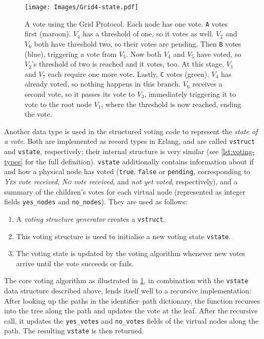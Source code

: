 \documentclass[12pt,chapterprefix=true,toc=bibliography,numbers=noendperiod,
               footnotes=multiple,twoside]{scrreprt}
\newcommand{\yes}{{\fontfamily{jkposn}\selectfont\textsc{Yes}}}
\newcommand{\no}{{\fontfamily{jkposn}\selectfont\textsc{No}}}
\newlength{\smallbaselineskip}
\begin{document}
\begin{figure}[p]
    \centering
    \texttt{[image: Images/Grid4-state.pdf]}
    \caption[A vote using the Grid Protocol]{A vote using the Grid Protocol. Each node has one vote. \texttt{A} votes first (maroon). \(V_4\) has a threshold of one, so it votes as well. \(V_2\) and \(V_6\) both have threshold two, so their votes are pending. Then \texttt{B} votes (blue), triggering a vote from \(V_5\). Now both \(V_4\) and \(V_5\) have voted, so \(V_2\)'s threshold of two is reached and it votes, too. At this stage, \(V_1\) and \(V_7\) each require one more vote. Lastly, \texttt{C} votes (green). \(V_4\) has already voted, so nothing happens in this branch. \(V_6\) receives a second vote, so it passes its vote to \(V_3\), immediately triggering it to vote to the root node \(V_1\), where the threshold is now reached, ending the vote.}
    \label{fig:grid4-state}
\end{figure}

Another data type is used in the structured voting code to represent the \emph{state of a vote}. Both are implemented as record types in Erlang, and are called \texttt{vstruct} and \texttt{vstate}, respectively; their internal structure is very similar (see \cref{lst:voting-types} for the full definition). \texttt{vstate} additionally contains information about if and how a physical node has voted (\texttt{true}, \texttt{false} or \texttt{pending}, corresponding to \emph{\yes{} vote received}, \emph{\no{} vote received}, and \emph{not yet voted}, respectively), and a summary of the children's votes for each virtual node (represented as integer fields \texttt{yes\_nodes} and \texttt{no\_nodes}). They are used as follows:

\begin{enumerate}
    \item A \emph{voting structure generator} creates a \texttt{vstruct}.
    \item This voting structure is used to initialise a new voting state \texttt{vstate}.
    \item The voting state is updated by the voting algorithm whenever new votes arrive until the vote succeeds or fails.
\end{enumerate}

The core voting algorithm as illustrated in \cref{fig:grid4-state}, in combination with the \texttt{vstate} data structure described above, lends itself well to a recursive implementation: After looking up the paths in the identifier--path dictionary, the function recurses into the tree along the path and updates the vote at the leaf. After the recursive call, it updates the \texttt{yes\_votes} and \texttt{no\_votes} fields of the virtual nodes along the path. The resulting \texttt{vstate} is then returned.
\end{document}

